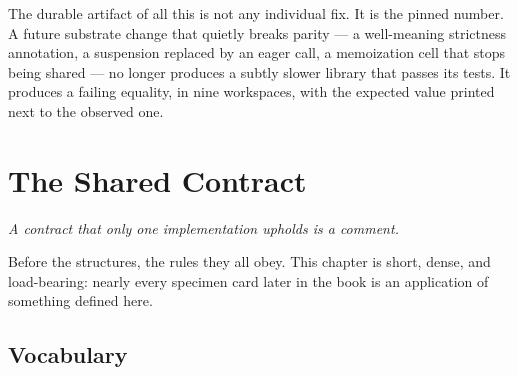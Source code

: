 \documentclass[11pt,twoside,openright]{book}
\newcommand{\motto}[1]{%
  \begingroup
  \vspace{-4pt}\hfill\begin{minipage}{0.80\textwidth}
    \raggedleft\itshape\color{d7slate}\small #1\par
  \end{minipage}\par\vspace{18pt}
  \endgroup}
\begin{document}
The durable artifact of all this is not any individual fix. It is the pinned
number. A future substrate change that quietly breaks parity --- a well-meaning
strictness annotation, a suspension replaced by an eager call, a memoization cell
that stops being shared --- no longer produces a subtly slower library that
passes its tests. It produces a failing equality, in nine workspaces, with the
expected value printed next to the observed one.


\chapter{The Shared Contract}
\label{ch:contract}

\motto{A contract that only one implementation upholds is a comment.}

\noindent
Before the structures, the rules they all obey. This chapter is short, dense,
and load-bearing: nearly every specimen card later in the book is an application
of something defined here.

\section{Vocabulary}
\end{document}
